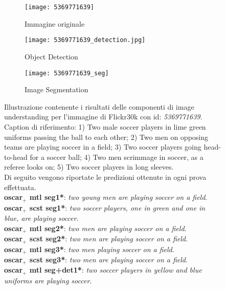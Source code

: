 \begin{figure}[H]
     \centering
     \begin{subfigure}[b]{0.45\textwidth}
         \centering
         \texttt{[image: 5369771639]}
         \caption{Immagine originale}
     \end{subfigure}
     \begin{subfigure}[b]{0.45\textwidth}
         \centering
         \texttt{[image: 5369771639\_detection.jpg]}
         \caption{Object Detection}
     \end{subfigure}
     \begin{subfigure}[b]{0.45\textwidth}
         \centering
         \texttt{[image: 5369771639\_seg]}
         \caption{Image Segmentation}
     \end{subfigure}
     \captionsetup{singlelinecheck=off}
        \caption{Illustrazione contenente i risultati delle componenti di image understanding per l'immagine di Flickr30k con id: \textit{5369771639}.
        Caption di riferimento: 1) Two male soccer players in lime green uniforms passing the ball to each other; 2) Two men on opposing teams are playing soccer in a field; 3) Two soccer players going head-to-head for a soccer ball; 4) Two men scrimmage in soccer, as a referee looks on; 5) Two soccer players in long sleeves.\\
        Di seguito vengono riportate le predizioni ottenute in ogni prova effettuata.\\
        \textbf{\acrshort{oscar}$_+$ \acrshort{mtl} seg1*}: \textit{two young men are playing soccer on a field}.\\
        \textbf{\acrshort{oscar}$_+$ \acrshort{scst} seg1*}: \textit{two soccer players, one in green and one in blue, are playing soccer}.\\
        \textbf{\acrshort{oscar}$_+$ \acrshort{mtl} seg2*}: \textit{two men are playing soccer on a field}.\\
        \textbf{\acrshort{oscar}$_+$ \acrshort{scst} seg2*}: \textit{two men are playing soccer on a field}.\\
        \textbf{\acrshort{oscar}$_+$ \acrshort{mtl} seg3*}: \textit{two men playing soccer on a field}.\\
        \textbf{\acrshort{oscar}$_+$ \acrshort{scst} seg3*}: \textit{two men are playing soccer on a field}.\\
        \textbf{\acrshort{oscar}$_+$ \acrshort{mtl} seg+det1*}: \textit{two soccer players in yellow and blue uniforms are playing soccer}.\\
}
\end{figure}

